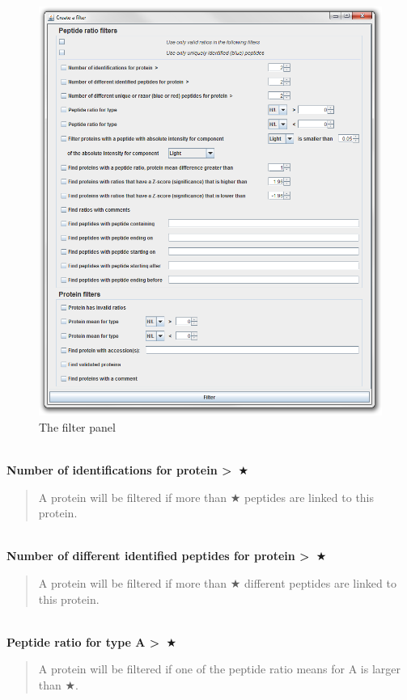 \documentclass[11pt,a4paper,oneside,notitlepage]{book}
\begin{document}
\begin{figure}[H]
\begin{center}
\includegraphics[scale=0.4]{Filter_S.png}
\caption{The filter panel}
\end{center}
\end{figure}
\\
\textbf{Number of identifications for protein \textgreater \ $\bigstar$}
\begin{quotation}
A protein will be filtered if more than $\bigstar$ peptides are linked to this protein.
\end{quotation}
\\
\textbf{Number of different identified peptides for protein \textgreater \ $\bigstar$}
\begin{quotation}A protein will be filtered if more than $\bigstar$ different peptides are linked to this protein.
\end{quotation}
\\
\textbf{Peptide ratio for type A \textgreater \ $\bigstar$}
\begin{quotation}A protein will be filtered if one of the peptide ratio means for A is larger than $\bigstar$.
\end{quotation}
\end{document}
